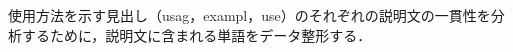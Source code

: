 \documentclass[uplatex,dvipdfmx,a4paper,twocolumn,base=11pt,jbase=11pt,ja=standard]{bxjsarticle}  %
\begin{document}




使用方法を示す見出し（usag，exampl，use）のそれぞれの説明文の一貫性を分析するために，説明文に含まれる単語をデータ整形する．
\end{document}
